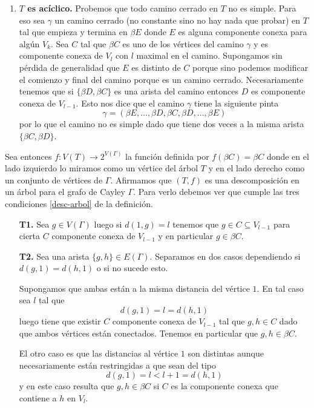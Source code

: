 \documentclass[tesis.tex]{subfiles}
\begin{document}
\begin{obs}
\begin{enumerate}[$\bullet$]
		\item \textbf{$T$ es acíclico.}
		Probemos que todo camino cerrado en $T$ no es simple.
		Para eso sea $\gamma$ un camino cerrado (no constante sino no hay nada que probar) en $T$ tal que empieza y termina en $\beta E$ donde $E$ es alguna componente conexa para algún $V_{k}$.
		Sea $C$ tal que $\beta C$ es uno de los vértices del camino $\gamma$ y es componente conexa de $V_{l}$ con $l$ maximal en el camino.
		Supongamos sin pérdida de generalidad que $E$ es distinto de $C$ porque sino podemos modificar el comienzo y final del camino porque es un camino cerrado.
		Necesariamente tenemos que si $\{ \beta D, \beta C \}$ es una arista del camino entonces $D$ es componente conexa de $V_{l-1}$.
		Esto nos dice que el camino $\gamma$ tiene la siguiente pinta
		\[
			\gamma = (\beta E, \dots, \beta D, \beta C, \beta D, \dots, \beta E)
		\]
		por lo que el camino no es simple dado que tiene dos veces a la misma arista $\{ \beta C, \beta D \}$.
		
	\end{enumerate}
	  
	Sea entonces $f: V(T) \to 2^{V(\Gamma)}$ la función definida por $f(\beta C) = \beta C$ donde en el lado izquierdo lo miramos como un vértice del árbol $T$ y en el lado derecho como un conjunto de vértices de $\Gamma$.
	Afirmamos que $(T,f)$ es una descomposición en un árbol para el grafo de Cayley $\Gamma$.
	Para verlo debemos ver que cumple las tres condiciones \ref{desc-arbol} de la definición. 
	\begin{enumerate}
		\item[\textbf{T1.}] Sea $g \in V(\Gamma)$ luego si $d(1,g) = l$
		tenemos que $g \in C \subseteq V_{l-1}$ para cierta $C$ componente conexa de $V_{l-1}$ y en particular $g \in \beta C$.		 
		
		
		\item[\textbf{T2.}] Sea una arista $\{g,h\} \in E(\Gamma)$. 
		Separamos en dos casos dependiendo si $d(g,1) = d(h,1)$ o si no sucede esto.
		
		Supongamos que ambas están a la misma distancia del vértice $1$. 
		En tal caso sea $l$ tal que 
		\[
			d(g,1)= l = d(h,1)
		\] 
		luego tiene que existir $C$ componente conexa de $V_{l-1}$ 
		tal que $g,h \in C$ dado que ambos vértices están conectados.
		Tenemos en particular que $g,h \in \beta C$.
		
		
		El otro caso es que las distancias al vértice $1$ son distintas aunque necesariamente están restringidas a que sean del tipo
		\[
			d(g,1)= l < l+1 = d(h,1)
		\] 
		y en este caso resulta que $g,h \in \beta C$ si $C$ es la componente conexa que contiene a $h$ en $V_l$.
		

\end{enumerate}
\end{obs}
\end{document}
